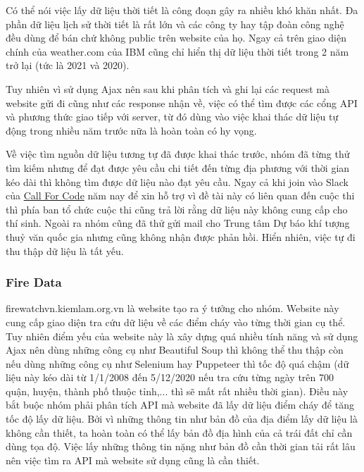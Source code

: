 \documentclass{article}
\begin{document}
Có thể nói việc lấy dữ liệu thời tiết là công đoạn gây ra nhiều khó khăn nhất. Đa phần dữ liệu lịch sử thời tiết là rất lớn và các công ty hay tập đoàn công nghệ đều dùng để bán chứ không public trên website của họ. Ngay cả trên giao diện chính của weather.com của IBM cũng chỉ hiển thị dữ liệu thời tiết trong 2 năm trở lại (tức là 2021 và 2020).

Tuy nhiên vì sử dụng Ajax nên sau khi phân tích và ghi lại các request mà website gửi đi cũng như các response nhận về, việc có thể tìm được các cổng API và phương thức giao tiếp với server, từ đó dùng vào việc khai thác dữ liệu tự động trong nhiều năm trước nữa là hoàn toàn có hy vọng.

Về việc tìm nguồn dữ liệu tương tự đã được khai thác trước, nhóm đã từng thử tìm kiếm nhưng để đạt được yêu cầu chi tiết đến từng địa phương với thời gian kéo dài thì không tìm được dữ liệu nào đạt yêu cầu. Ngay cả khi join vào Slack của \href{https://callforcode.org/}{Call For Code} năm nay để xin hỗ trợ vì đề tài này có liên quan đến cuộc thi thì phía ban tổ chức cuộc thi cũng trả lời rằng dữ liệu này không cung cấp cho thí sinh. Ngoài ra nhóm cũng đã thử gửi mail cho Trung tâm Dự báo khí tượng thuỷ văn quốc gia nhưng cũng không nhận được phản hồi. Hiển nhiên, việc tự đi thu thập dữ liệu là tất yếu.

\subsubsection{Fire Data}
\qquad firewatchvn.kiemlam.org.vn là website tạo ra ý tưởng cho nhóm. Website này cung cấp giao diện tra cứu dữ liệu về các điểm cháy vào từng thời gian cụ thể. Tuy nhiên điểm yếu của website này là xây dựng quá nhiều tính năng và sử dụng Ajax nên dùng những công cụ như Beautiful Soup thì không thể thu thập còn nếu dùng những công cụ như Selenium hay Puppeteer thì tốc độ quá chậm (dữ liệu này kéo dài từ 1/1/2008 đến 5/12/2020 nếu tra cứu từng ngày trên 700 quận, huyện, thành phố thuộc tỉnh,... thì sẽ mất rất nhiều thời gian). Điều này bắt buộc nhóm phải phân tích API mà website đã lấy dữ liệu điểm cháy để tăng tốc độ lấy dữ liệu. Bởi vì những thông tin như bản đồ của địa điểm lấy dữ liệu là không cần thiết, ta hoàn toàn có thể lấy bản đồ địa hình của cả trái đất chỉ cần dùng tọa độ. Việc lấy những thông tin nặng như bản đồ cần thời gian tải rất lâu nên việc tìm ra API mà website sử dụng cũng là cần thiết.


\end{document}
